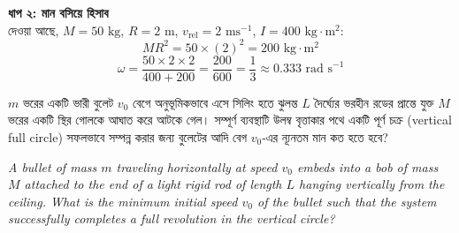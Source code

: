 \documentclass[12pt, a4paper]{article}
\begin{document}
{{\begin{tcolorbox}[solutionbox={সমাধান (Solution)}]
    \vspace{0.5em}
    \noindent\textbf{ধাপ ২: মান বসিয়ে হিসাব} \\
    দেওয়া আছে, $M = 50\text{ kg}$, $R = 2\text{ m}$, $v_{\text{rel}} = 2\text{ ms}^{-1}$, $I = 400\text{ kg}\cdot\text{m}^2$:
    \[ M R^2 = 50 \times (2)^2 = 200\text{ kg}\cdot\text{m}^2 \]
    \[ \omega = \frac{50 \times 2 \times 2}{400 + 200} = \frac{200}{600} = \frac{1}{3} \approx \mathbf{0.333}\text{ rad s}^{-1} \]
\end{tcolorbox}

\newpage

\begin{tcolorbox}[questionbox={প্রশ্ন (Question) 36}]
    \noindent
    $m$ ভরের একটি ভারী বুলেট $v_0$ বেগে অনুভূমিকভাবে এসে সিলিং হতে ঝুলন্ত $L$ দৈর্ঘ্যের ভরহীন রডের প্রান্তে যুক্ত $M$ ভরের একটি স্থির গোলকে আঘাত করে আটকে গেল। সম্পূর্ণ ব্যবস্থাটি উলম্ব বৃত্তাকার পথে একটি পূর্ণ চক্র (vertical full circle) সফলভাবে সম্পন্ন করার জন্য বুলেটের আদি বেগ $v_0$-এর ন্যূনতম মান কত হতে হবে?
    
    \vspace{0.8em}
    \begin{english}
    \noindent\textit{\color{darkgray}
    A bullet of mass $m$ traveling horizontally at speed $v_0$ embeds into a bob of mass $M$ attached to the end of a light rigid rod of length $L$ hanging vertically from the ceiling. What is the minimum initial speed $v_0$ of the bullet such that the system successfully completes a full revolution in the vertical circle?
    }
    \end{english}
\end{tcolorbox}

\vspace{1em}
\begin{center}
\end{center}}}
\end{document}
